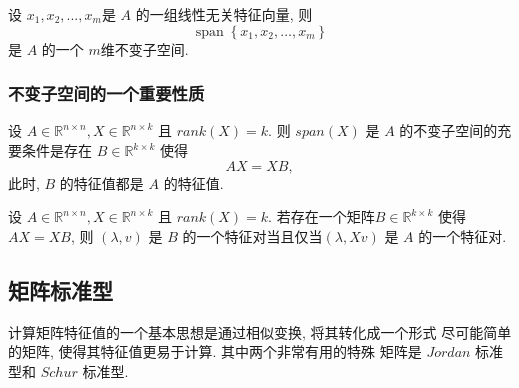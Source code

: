 \documentclass[12pt,a4paper]{article}
\begin{document}
\begin{framed}
	\begin{theorem}
	设 $x_1, x_2, . . . , x_m $是 $A$ 的一组线性无关特征向量, 则
	$$
	\operatorname{span}\left\{x_{1}, x_{2}, \ldots, x_{m}\right\}
	$$
	是 $A$ 的一个 $m $维不变子空间.
	\end{theorem}
\end{framed}


\subsubsection{不变子空间的一个重要性质}
\begin{framed}
	\begin{theorem}
		设 $A ∈ \mathbb{R}^{n×n}, X ∈ \mathbb{R}^{n×k}$ 且 $rank(X) = k$. 则 $span(X)$ 是 $A$ 的不变子空间的充要条件是存在 $B ∈ \mathbb{R}^{k×k}$ 使得
		$$AX = XB,$$
		此时, $B$ 的特征值都是 $A$ 的特征值. 
	\end{theorem}
\end{framed}

\begin{framed}
	\begin{corollary}
		设 $A ∈ \mathbb{R}^{n×n}, X ∈ \mathbb{R}^{n×k}$ 且 $rank(X) = k$. 若存在一个矩阵$B ∈ \mathbb{R}^{k×k}$ 使得 $AX = XB$, 则 $(λ, v)$ 是 $B$ 的一个特征对当且仅当$(λ, Xv)$ 是 $A$ 的一个特征对.
	\end{corollary}
\end{framed}

\subsection{矩阵标准型}
计算矩阵特征值的一个基本思想是通过相似变换, 将其转化成一个形式
尽可能简单的矩阵, 使得其特征值更易于计算. 其中两个非常有用的特殊
矩阵是 $Jordan$ 标准型和 $Schur$ 标准型.
\end{document}
